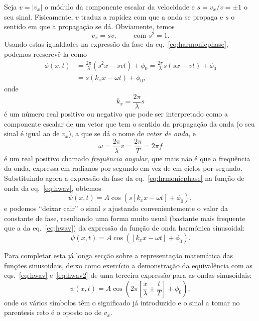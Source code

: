 Seja $v=|v_x|$ o módulo da componente escalar da velocidade e $s=v_x/v=\pm1$ o
seu sinal. Fisicamente, $v$ traduz a rapidez com que a onda se propaga e $s$ o
sentido em que a propagação se dá. Obviamente, temos
\begin{equation*}
v_x=sv,\qquad\text{ com }s^2=1.
\end{equation*}
Usando estas igualdades na expressão da fase da eq.~\eqref{eq:harmonicphase},
podemos reescrevê-la como
\begin{align}
    \phi(x,t)&=\frac{2\pi}{\lambda}(s^2x-svt)+\phi_0=
    \frac{2\pi}{\lambda}s(sx-vt)+\phi_0\nonumber\\
&=s(k_xx-\omega t)+\phi_0,\label{eq:hrmonicphase}
\end{align}
onde
\begin{equation}
k_x=\frac{2\pi}{\lambda}s
\end{equation}
é um número real positivo ou negativo que pode ser interpretado como a
componente escalar de um vetor que tem o sentido da propagação da onda (o seu
sinal é igual ao de $v_x$), a que se dá o nome de \emph{vetor de onda}, e
\begin{equation}
\omega=\frac{2\pi}{\lambda}v=\frac{2\pi}{T}=2\pi f
\end{equation}
é um real positivo chamado \emph{frequência angular}, que mais não é que a
frequência da onda, expressa em radianos por segundo em vez de em ciclos por
segundo. Substituindo agora a expressão da fase da eq.~\eqref{eq:hrmonicphase}
na função de onda da eq.~\eqref{eq:hwav}, obtemos
\begin{equation*}
\psi(x,t)=A\cos(s[k_xx-\omega t] +\phi_0),
\end{equation*}
e podemos ``deixar cair'' o sinal $s$ ajustando convenientemente
o valor da constante de fase, resultando uma forma muito usual
(bastante mais frequente que a da eq.~\eqref{eq:hwav}) da expressão da função de
onda harmónica sinusoidal:
\begin{equation}\label{eq:hwav2}
\psi(x,t)=A\cos([k_xx-\omega t] +\phi_0).
\end{equation}

Para completar esta já longa secção sobre a representação matemática das funções
sinusoidais, deixo como exercício a demonstração da equivalência com as
eqs.~\eqref{eq:hwav} e~\eqref{eq:hwav2} de uma terceira expressão para as ondas
sinusoidais:
\begin{equation*}
\psi(x,t) = A\cos\left(2\pi\left[\frac{x}{\lambda}\pm\frac{t}{T}\right]+\phi_0
\right),
\end{equation*}
onde os vários símbolos têm o significado já introduzido e o sinal a tomar no
parentesis reto é o oposto ao de $v_x$.



